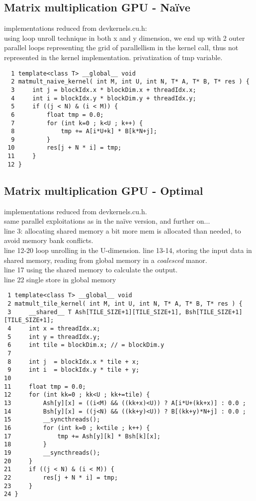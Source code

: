 \documentclass[a4paper,10pt]{article}
\begin{document}
\vfill 

\subsection{Matrix multiplication GPU - Naïve} implementations reduced from devkernels.cu.h: \\
using loop unroll technique in both x and y dimension, we end up with 2 outer parallel loops representing the grid of parallellism in the kernel call, thus not represented in the kernel implementation.
privatization of tmp variable.
\begin{verbatim}
  1 template<class T> __global__ void
  2 matmult_naive_kernel( int M, int U, int N, T* A, T* B, T* res ) {
  3     int j = blockIdx.x * blockDim.x + threadIdx.x;
  4     int i = blockIdx.y * blockDim.y + threadIdx.y;
  5     if ((j < N) & (i < M)) {
  6         float tmp = 0.0;
  7         for (int k=0 ; k<U ; k++) {
  8             tmp += A[i*U+k] * B[k*N+j];
  9         }
 10         res[j + N * i] = tmp;
 11     }
 12 }
\end{verbatim}

\vfill


\subsection{Matrix multiplication GPU - Optimal} implementations reduced from devkernels.cu.h.\\
same parallel exploitations as in the naïve version, and further on...\\
line 3: allocating shared memory a bit more mem is allocated than needed, to avoid memory bank conflicts.\\
line 12-20 loop unrolling in the U-dimension.
line 13-14, storing the input data in shared memory, reading from global memory in a \textit{coalesced} manor.\\
line 17 using the shared memory to calculate the output.\\
line 22 single store in global memory
\begin{verbatim}
 1 template<class T> __global__ void
 2 matmult_tile_kernel( int M, int U, int N, T* A, T* B, T* res ) {
 3     __shared__ T Ash[TILE_SIZE+1][TILE_SIZE+1], Bsh[TILE_SIZE+1][TILE_SIZE+1];
 4     int x = threadIdx.x;
 5     int y = threadIdx.y;
 6     int tile = blockDim.x; // = blockDim.y
 7 
 8     int j  = blockIdx.x * tile + x;
 9     int i  = blockIdx.y * tile + y;
10
11     float tmp = 0.0;
12     for (int kk=0 ; kk<U ; kk+=tile) {
13         Ash[y][x] = ((i<M) && ((kk+x)<U)) ? A[i*U+(kk+x)] : 0.0 ;
14         Bsh[y][x] = ((j<N) && ((kk+y)<U)) ? B[(kk+y)*N+j] : 0.0 ;
15         __syncthreads();
16         for (int k=0 ; k<tile ; k++) {
17             tmp += Ash[y][k] * Bsh[k][x];
18         }
19         __syncthreads();
20     }
21     if ((j < N) & (i < M)) {
22         res[j + N * i] = tmp;
23     }
24 }
\end{verbatim}
\vfill
\end{document}

